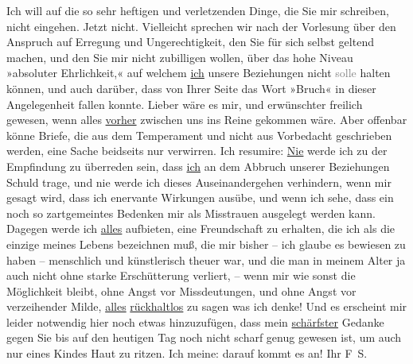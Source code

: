 \pstart
           Ich will auf die so sehr heftigen und verletzenden Dinge, die Sie mir schreiben,
               nicht eingehen. Jetzt nicht. Vielleicht sprechen wir nach der Vorlesung über den
               Anspruch auf Erregung und Ungerechtigkeit, den Sie für sich selbst geltend machen,
               und den Sie mir nicht zubilligen wollen, über das hohe Niveau »absoluter
               Ehrlichkeit,« auf welchem \uline{ich} unsere Beziehungen
               nicht \textcolor{gray}{solle} halten können, und auch darüber, dass von Ihrer Seite
               das Wort »Bruch« in dieser Angelegenheit fallen konnte. Lieber wäre es mir, und
               erwünschter freilich gewesen, wenn alles \uline{vorher}
               zwischen uns ins Reine gekommen wäre. Aber offenbar könne
               Briefe, die aus dem Temperament und nicht aus Vorbedacht geschrieben werden, eine
               Sache beidseits nur verwirren. Ich resumire: \uline{Nie} werde ich {\pb}zu der Empfindung zu überreden
               sein, dass \uline{ich} an dem Abbruch unserer Beziehungen
               Schuld trage, und nie werde ich dieses Auseinandergehen verhindern, wenn mir gesagt
               wird, dass ich enervante Wirkungen ausübe, und wenn ich sehe, dass ein noch so
               zartgemeintes Bedenken mir als Misstrauen ausgelegt werden kann. Dagegen werde ich
                  \uline{alles} aufbieten, eine Freundschaft zu erhalten,
               die ich als die einzige meines Lebens bezeichnen muß, die mir bisher – ich glaube es
               bewiesen zu haben – menschlich und künstlerisch theuer war, und die man in meinem
               Alter ja auch nicht ohne starke Erschütterung verliert, – wenn mir wie sonst die
               Möglichkeit bleibt, ohne Angst vor Missdeutungen, und ohne Angst vor verzeihender
               Milde, \uline{alles}{ }\uline{rückhaltlos} zu sagen was ich denke! Und es erscheint
               mir leider notwendig hier noch etwas hinzuzufügen, dass mein \uline{schärfster} Gedanke \introOben{}gegen Sie\introOben{} bis auf den
               heutigen Tag noch nicht scharf genug gewesen ist, um auch nur eines Kindes Haut zu
               ritzen. Ich meine: darauf kommt es an!\pend
           \pstart Ihr \spacefill\mbox{F S.}\pend{}\endnumbering{}  \newcommand{\dateiname}{L03355}\newcommand{\titel}{Felix Salten an Arthur Schnitzler, [11. 11. 1903]}\newcommand{\editorInnen}{Martin Anton Müller und Laura Untner}
